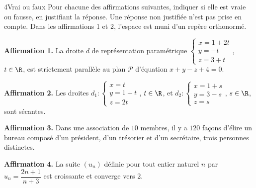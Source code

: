 \begin{exoBac}{4}{Vrai ou faux}
Pour chacune des affirmations suivantes, indiquer si elle est vraie ou fausse, en justifiant la réponse. Une réponse non justifiée
n'est pas prise en compte. Dans les affirmations 1 et 2, l'espace est muni d'un repère orthonormé.
\begin{questions}
  \item \textbf{Affirmation 1.} La droite $d$ de représentation paramétrique $\begin{cases}x=1+2t\\y=-t\\z=3+t\end{cases}$, $t\in\R$, est
    strictement parallèle au plan $\mathcal{P}$ d'équation $x+y-z+4=0$.
  \item \textbf{Affirmation 2.} Les droites $d_1:\begin{cases}x=t\\y=1+t\\z=2t\end{cases}$, $t\in\R$, et
    $d_2:\begin{cases}x=1+s\\y=3-s\\z=s\end{cases}$, $s\in\R$, sont sécantes.
  \item \textbf{Affirmation 3.} Dans une association de $10$ membres, il y a $120$ façons d'élire un bureau composé d'un président,
    d'un trésorier et d'un secrétaire, trois personnes distinctes.
  \item \textbf{Affirmation 4.} La suite $(u_n)$ définie pour tout entier naturel $n$ par $u_n=\dfrac{2n+1}{n+3}$ est croissante et
    converge vers $2$.
\end{questions}
\end{exoBac}

